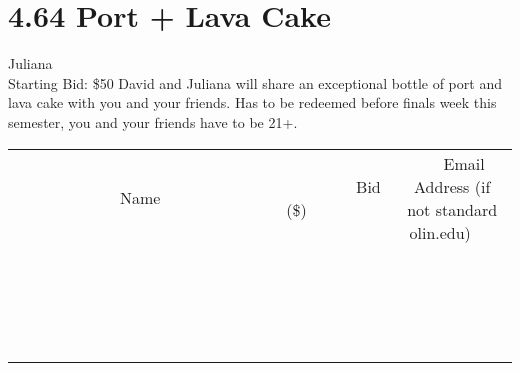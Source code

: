 \documentclass[11pt]{article}
\begin{document}
\section*{4.64 Port + Lava Cake}
Juliana
\\
Starting Bid: \$50
\newline
David and Juliana will share an exceptional bottle of port and lava cake with you and your friends. Has to be redeemed before finals week this semester, you and your friends have to be 21+.
\\[3ex]
\begin{tabular}{c c c}
~~~~~~~~~~~~~Name~~~~~~~~~~~~~ & ~~~~~~~~~Bid (\$)~~~~~~~~~  & ~~~Email Address (if not standard olin.edu)~~~\\
 & & \\
\hline
 & & \\
\hline
 & & \\
\hline
 & & \\
\hline
 & & \\
\hline
 & & \\
\hline
 & & \\
\hline
 & & \\
\hline
 & & \\
\hline
 & & \\
\hline
 & & \\
\hline
 & & \\
\hline
 & & \\
\hline
 & & \\
\hline
 & & \\
\hline
 & & \\
\hline
 & & \\
\hline
 & & \\
\hline
 & & \\
\hline
\end{tabular}
\newpage
\end{document}
